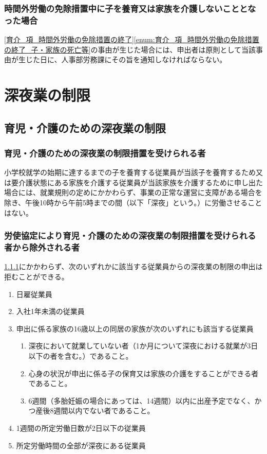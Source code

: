 \documentclass{jsarticle}
\begin{document}
\subsubsection{時間外労働の免除措置中に子を養育又は家族を介護しないこととなった場合}
\label{育介_項_時間外労働の免除措置中に子を養育又は家族を介護しないこととなった場合}
\ref{育介_項_時間外労働の免除措置の終了}\ref{enum:育介_項_時間外労働の免除措置の終了_子・家族の死亡等}の事由が生じた場合には、申出者は原則として当該事由が生じた日に、人事部労務課にその旨を通知しなければならない。

\section{深夜業の制限}

\subsection{育児・介護のための深夜業の制限}
\label{育介_条_育児・介護のための深夜業の制限}

\subsubsection{育児・介護のための深夜業の制限措置を受けられる者}
\label{育介_項_育児・介護のための深夜業の制限措置を受けられる者}
小学校就学の始期に達するまでの子を養育する従業員が当該子を養育するため又は要介護状態にある家族を介護する従業員が当該家族を介護するために申し出た場合には、就業規則の定めにかかわらず、事業の正常な運営に支障がある場合を除き、午後10時から午前5時までの間（以下「深夜」という。）に労働させることはない。 

\subsubsection{労使協定により育児・介護のための深夜業の制限措置を受けられる者から除外される者}
\label{育介_項_労使協定により育児・介護のための深夜業の制限措置を受けられる者から除外される者}
\ref{育介_項_育児・介護のための深夜業の制限措置を受けられる者}にかかわらず、次のいずれかに該当する従業員からの深夜業の制限の申出は拒むことができる。
\begin{enumerate}
  \item 日雇従業員 
  \item 入社1年未満の従業員 
  \item 申出に係る家族の16歳以上の同居の家族が次のいずれにも該当する従業員
  \begin{enumerate}
    \item 深夜において就業していない者（1か月について深夜における就業が3日以下の者を含む。）であること。
    \item 心身の状況が申出に係る子の保育又は家族の介護をすることができる者であること。 
    \item 6週間（多胎妊娠の場合にあっては、14週間）以内に出産予定でなく、かつ産後8週間以内でない者であること。 
  \end{enumerate}
  \item 1週間の所定労働日数が2日以下の従業員
  \item 所定労働時間の全部が深夜にある従業員 
\end{enumerate}
\end{document}
